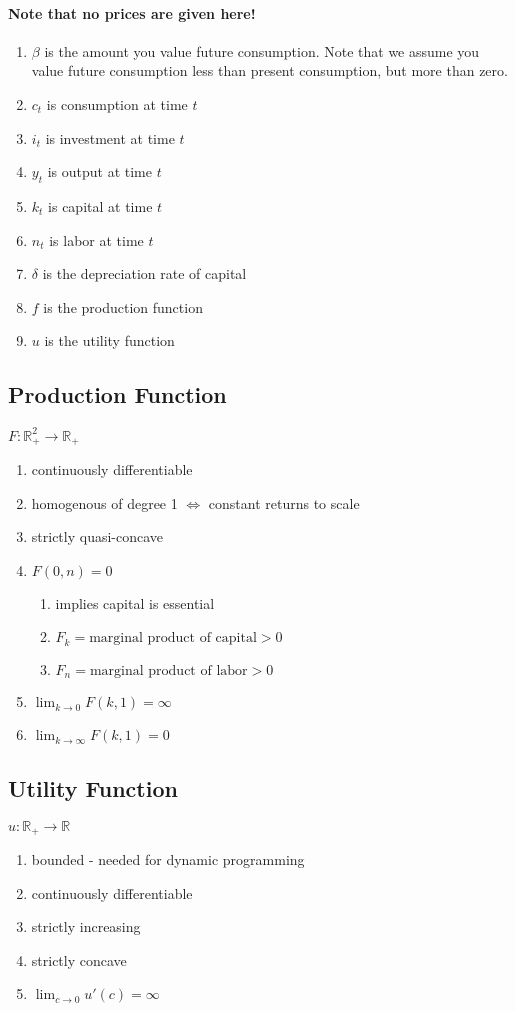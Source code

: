\documentclass{article}
\begin{document}
\paragraph{Note that no prices are given here!}
\begin {enumerate}
    \item $\beta$ is the amount you value future consumption. Note 
that we assume you value future consumption less than present 
consumption, but more than zero.
    \item $c_t$ is consumption at time $t$
    \item $i_t$ is investment at time $t$
    \item $y_t$ is output at time $t$
    \item $k_t$ is capital at time $t$
    \item $n_t$ is labor at time $t$
    \item $\delta$ is the depreciation rate of capital
    \item $f$ is the production function
    \item $u$ is the utility function
\end{enumerate}

\subsection{Production Function}
$F : \mathbb{R}^2_+ \rightarrow \mathbb{R}_+$
\begin{enumerate}
    \item continuously differentiable
    \item homogenous of degree 1 $\Leftrightarrow$ constant returns to scale
    \item strictly quasi-concave
    \item $F(0,n) = 0$
    \begin {enumerate}
        \item implies capital is essential
        \item $F_k = \text{marginal product of capital} > 0$
        \item $F_n = \text{marginal product of labor} > 0$
    \end{enumerate}
    \item $\lim_{k \to 0} F(k,1) = \infty$
    \item $\lim_{k \to \infty} F(k,1) = 0$
\end{enumerate}

\subsection{Utility Function}
$u : \mathbb{R}_+ \rightarrow \mathbb{R}$
\begin{enumerate}
    \item bounded - needed for dynamic programming
    \item continuously differentiable
    \item strictly increasing
    \item strictly concave
    \item $\lim_{c \to 0} u'(c) = \infty$
\end{enumerate}
\end{document}
